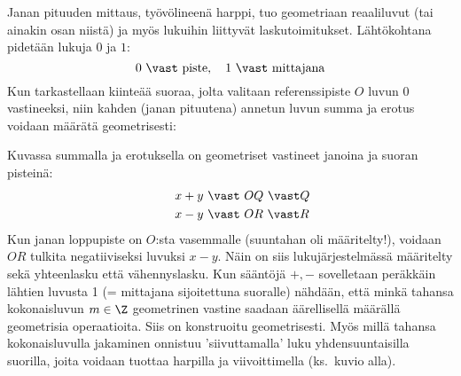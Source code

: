 Janan pituuden mittaus, työvölineenä harppi, tuo geometriaan reaaliluvut 
(tai ainakin osan niistä) ja myös lukuihin liittyvät laskutoimitukset. Lähtökohtana
pidetään lukuja $0$ ja $1$:
\[
0\ \vast\ \text{piste}, \quad 1\ \vast\ \text{mittajana}
\]
Kun tarkastellaan kiinteää suoraa, jolta valitaan referenssipiste $O$ luvun $0$ vastineeksi, 
niin kahden (janan pituutena) annetun luvun summa ja erotus voidaan määrätä geometrisesti:
\begin{figure}[htb]
\begin{center}
\end{center}
\end{figure}

Kuvassa summalla ja erotuksella on geometriset vastineet janoina ja suoran pisteinä:
\begin{align*}
\qquad &x+y\ \vast\ OQ\ \vast Q  \\
\qquad &x-y\ \vast\ OR\ \vast R
\end{align*}
Kun janan loppupiste on $O$:sta vasemmalle (suuntahan oli määritelty!), voidaan $OR$ tulkita 
negatiiviseksi luvuksi $x-y$. Näin on siis lukujärjestelmässä määritelty sekä yhteenlasku että
vähennyslasku. Kun sääntöjä $+,-$ sovelletaan peräkkäin lähtien luvusta 1 (= mittajana
sijoitettuna suoralle) nähdään, että minkä tahansa kokonaisluvun $m\in{\Z}$ geometrinen vastine
saadaan äärellisellä määrällä geometrisia operaatioita. Siis {\Z} on konstruoitu geometrisesti.
Myös millä tahansa kokonaisluvulla jakaminen onnistuu 'siivuttamalla' luku yhdensuuntaisilla 
suorilla, joita voidaan  tuottaa harpilla ja viivoittimella (ks.\ kuvio alla).

